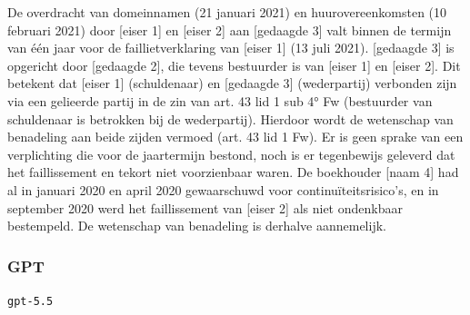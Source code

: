 \documentclass[
  dutch,
  a4paper,
]{article}
\begin{document}
De overdracht van domeinnamen (21 januari 2021) en huurovereenkomsten (10 februari 2021) door {[}eiser 1{]} en {[}eiser 2{]} aan {[}gedaagde 3{]} valt binnen de termijn van één jaar voor de faillietverklaring van {[}eiser 1{]} (13 juli 2021). {[}gedaagde 3{]} is opgericht door {[}gedaagde 2{]}, die tevens bestuurder is van {[}eiser 1{]} en {[}eiser 2{]}. Dit betekent dat {[}eiser 1{]} (schuldenaar) en {[}gedaagde 3{]} (wederpartij) verbonden zijn via een gelieerde partij in de zin van art. 43 lid 1 sub 4° Fw (bestuurder van schuldenaar is betrokken bij de wederpartij). Hierdoor wordt de wetenschap van benadeling aan beide zijden vermoed (art. 43 lid 1 Fw). Er is geen sprake van een verplichting die voor de jaartermijn bestond, noch is er tegenbewijs geleverd dat het faillissement en tekort niet voorzienbaar waren. De boekhouder {[}naam 4{]} had al in januari 2020 en april 2020 gewaarschuwd voor continuïteitsrisico's, en in september 2020 werd het faillissement van {[}eiser 2{]} als niet ondenkbaar bestempeld. De wetenschap van benadeling is derhalve aannemelijk.

\newpage


\subsubsection{GPT}\label{gpt-7}

\texttt{gpt-5.5}
\end{document}
